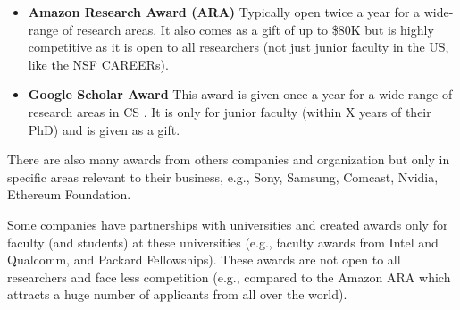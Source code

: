 \documentclass[oneside,11pt]{book}
\begin{document}
\begin{itemize}
  \item \textbf{Amazon Research Award (ARA)} Typically open twice a year for a wide-range of research areas. It also comes as a gift of up to \$80K but is highly competitive as it is open to all researchers (not just junior faculty in the US, like the NSF CAREERs).
  \item \textbf{Google Scholar Award} This award is given once a year for a wide-range of research areas in CS . It is only for junior faculty (within X years of their PhD) and is given as a gift.

\end{itemize}

There are also many awards from others companies and organization but only in specific areas relevant to their business, e.g., Sony, Samsung, Comcast, Nvidia, Ethereum Foundation. 

Some companies have partnerships with universities and created awards only for faculty (and students) at these universities (e.g., faculty awards from Intel and Qualcomm, and Packard Fellowships). 
These awards are not open to all researchers and face less competition (e.g.,  compared to the Amazon ARA which attracts a huge number of applicants from all over the world).

\end{document}
